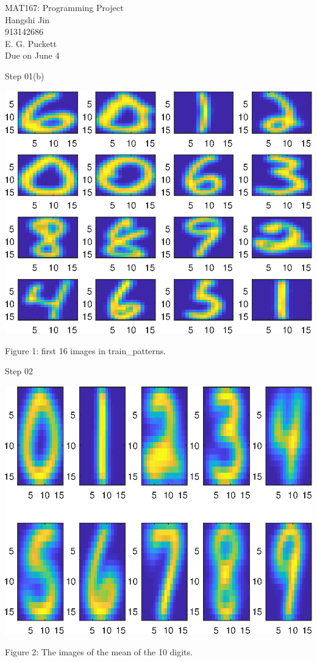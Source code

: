 \documentclass{article}
\begin{document}
\begin{flushright}MAT167: Programming Project\\ Hangshi Jin\\ 913142686\\ E. G. Puckett\\Due on June 4
\end{flushright}
\begin{large}Step 01(b)\end{large}
\begin{center}
   \includegraphics[scale=0.9]{First16.eps}
   \begin{center}Figure 1: first 16 images in train\_patterns.\end{center}
\end{center}
\begin{large}Step 02\end{large}
\begin{center}
   \includegraphics[scale=0.9]{10MDI.eps}
   \begin{center}Figure 2: The images of the mean of the 10 digits.\end{center}
\end{center}
\end{document}
